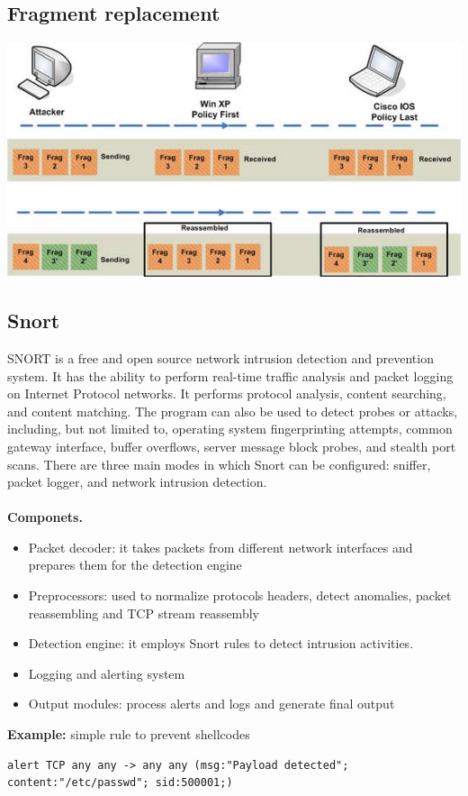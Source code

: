\documentclass[10pt,a4paper]{book}
\begin{document}
\subsection{Fragment replacement}
\includegraphics{IDS-evasion/4.jpg}
\newpage
\subsection{Snort}
SNORT is a free and open source network intrusion detection and prevention system. 
It has the ability to perform real-time traffic analysis and packet logging on Internet Protocol networks. It performs protocol analysis, content searching, and content matching. The program can also be used to
detect probes or attacks, including, but not limited to, operating system fingerprinting attempts, common gateway
interface, buffer overflows, server message block probes, and stealth port scans. There are three main modes in which Snort can be configured: sniffer, packet logger, and network intrusion detection.\\\\
\textbf{Componets.}
\begin{itemize}[noitemsep,nolistsep]
\item Packet decoder: it takes packets from different network interfaces and prepares them for the detection engine
\item Preprocessors: used to normalize protocols headers, detect anomalies, packet reassembling and TCP stream reassembly
\item Detection engine: it employs Snort rules to detect intrusion activities.
\item Logging and alerting system
\item Output modules: process alerts and logs and generate final output
\end{itemize}
\textbf{Example:} simple rule to prevent shellcodes
\begin{verbatim}
alert TCP any any -> any any (msg:"Payload detected"; content:"/etc/passwd"; sid:500001;)
\end{verbatim}
\end{document}
